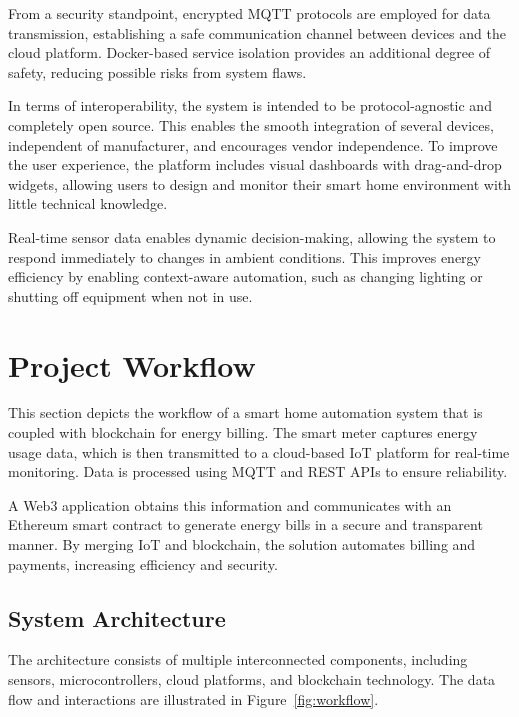 \documentclass[a4paper,12pt]{report}
\begin{document}
From a security standpoint, encrypted MQTT protocols are employed for data transmission, establishing a safe communication channel between devices and the cloud platform. Docker-based service isolation provides an additional degree of safety, reducing possible risks from system flaws.

In terms of interoperability, the system is intended to be protocol-agnostic and completely open source. This enables the smooth integration of several devices, independent of manufacturer, and encourages vendor independence. To improve the user experience, the platform includes visual dashboards with drag-and-drop widgets, allowing users to design and monitor their smart home environment with little technical knowledge.

Real-time sensor data enables dynamic decision-making, allowing the system to respond immediately to changes in ambient conditions. This improves energy efficiency by enabling context-aware automation, such as changing lighting or shutting off equipment when not in use.

\section{Project Workflow}

This section depicts the workflow of a smart home automation system that is coupled with blockchain for energy billing. The smart meter captures energy usage data, which is then transmitted to a cloud-based IoT platform for real-time monitoring\cite{jain2014raspberry}\cite{chaudhari2017smart}. Data is processed using MQTT and REST APIs to ensure reliability.

A Web3 application obtains this information and communicates with an Ethereum smart contract to generate energy bills in a secure and transparent manner\cite{10.1145/3328833.3328857}\cite{Hu2018BlockchainbasedSC}. By merging IoT and blockchain, the solution automates billing and payments, increasing efficiency and security.

\subsection{System Architecture}

The architecture consists of multiple interconnected components, including sensors, microcontrollers, cloud platforms, and blockchain technology. The data flow and interactions are illustrated in Figure~\ref{fig:workflow}.
\end{document}
